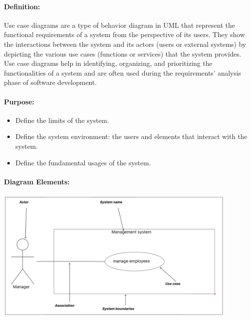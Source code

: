 \documentclass{article}
\begin{document}
\paragraph*{\textbf{Definition:} }

Use case diagrams are a type of behavior diagram in UML that represent the functional requirements of a system from the perspective of its users. They show the interactions between the system and its actors (users or external systems) by depicting the various use cases (functions or services) that the system provides. Use case diagrams help in identifying, organizing, and prioritizing the functionalities of a system and are often used during the requirements' analysis phase of software development.

\paragraph*{\textbf{Purpose: }}
\begin{itemize}
    \item Define the limits of the system.
    \item Define the system environment: the users and elements that interact with the system.
    \item Define the fundamental usages of the system.
\end{itemize}

\paragraph*{\textbf{Diagram Elements: }}
\vspace{0.3cm}
\begin{center}
    \includegraphics[width=451px]{media/use_case_elements.png}
\end{center}
\end{document}
